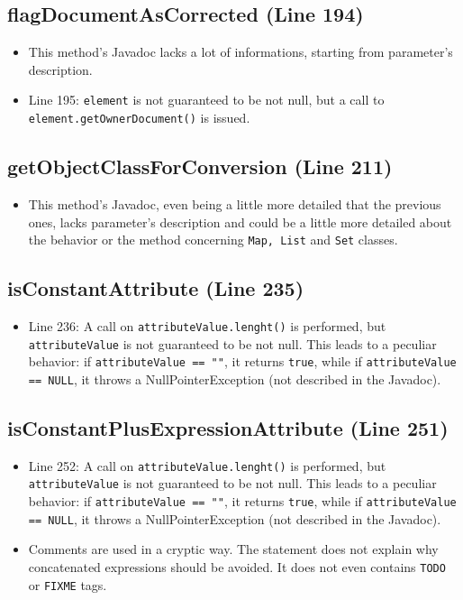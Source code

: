 \documentclass[11pt]{article} %
\begin{document}
\subsection{flagDocumentAsCorrected (Line 194)}
\begin{itemize}
	\item This method's Javadoc lacks a lot of informations, starting from parameter's description.
	\item Line 195: \texttt{element} is not guaranteed to be not null, but a call to \texttt{element.getOwnerDocument()} is issued.
\end{itemize}

\subsection{getObjectClassForConversion (Line 211)}
\begin{itemize}
	\item This method's Javadoc, even being a little more detailed that the previous ones, lacks parameter's description and could be a little more detailed about the behavior or the method concerning \texttt{Map, List} and \texttt{Set} classes.
\end{itemize}

\subsection{isConstantAttribute (Line 235)}
\begin{itemize}
	\item Line 236: A call on \texttt{attributeValue.lenght()} is performed, but \texttt{attributeValue} is not guaranteed to be not null. This leads to a peculiar behavior: if \texttt{attributeValue == ""}, it returns \texttt{true}, while if \texttt{attributeValue == NULL}, it throws a NullPointerException (not described in the Javadoc).
\end{itemize}

\subsection{isConstantPlusExpressionAttribute (Line 251)}
\begin{itemize}
	\item Line 252: A call on \texttt{attributeValue.lenght()} is performed, but \texttt{attributeValue} is not guaranteed to be not null. This leads to a peculiar behavior: if \texttt{attributeValue == ""}, it returns \texttt{true}, while if \texttt{attributeValue == NULL}, it throws a NullPointerException (not described in the Javadoc).
	\item Comments are used in a cryptic way. The statement does not explain why concatenated expressions should be avoided. It does not even contains \texttt{TODO} or \texttt{FIXME} tags.
\end{itemize}
\end{document}
